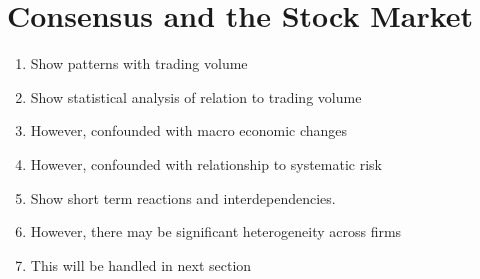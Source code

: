 \section{Consensus and the Stock Market}
\begin{enumerate}
  \item Show patterns with trading volume
  \item Show statistical analysis of relation to trading volume
  \item However, confounded with macro economic changes
  \item However, confounded with relationship to systematic risk
  \item Show short term reactions and interdependencies.
  \item However, there may be significant heterogeneity across firms
  \item This will be handled in next section
 \end{enumerate}


